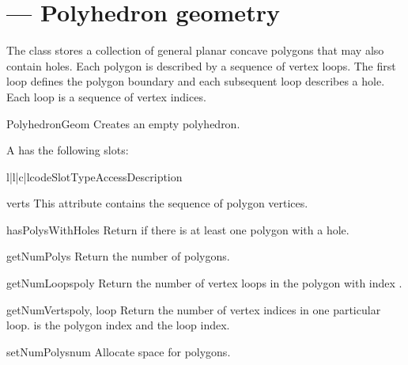 
\section{ ---
         Polyhedron geometry}

The  class stores a collection of general planar
concave polygons that may also contain holes. Each polygon is described
by a sequence of vertex loops. The first loop defines the polygon boundary
and each subsequent loop describes a hole. Each loop is a sequence of
vertex indices.

\begin{classdesc}{PolyhedronGeom}{}
Creates an empty polyhedron.
\end{classdesc}

A  has the following slots:

\begin{tableiv}{l|l|c|l}{code}{Slot}{Type}{Access}{Description}
\end{tableiv}

\begin{memberdesc}{verts}
This attribute contains the sequence of polygon vertices.
\end{memberdesc}

\begin{methoddesc}{hasPolysWithHoles}{}
Return  if there is at least one polygon with a hole.
\end{methoddesc}

\begin{methoddesc}{getNumPolys}{}
Return the number of polygons.
\end{methoddesc}

\begin{methoddesc}{getNumLoops}{poly}
Return the number of vertex loops in the polygon with index .
\end{methoddesc}

\begin{methoddesc}{getNumVerts}{poly, loop}
Return the number of vertex indices in one particular loop. 
is the polygon index and  the loop index.
\end{methoddesc}

\begin{methoddesc}{setNumPolys}{num}
Allocate space for  polygons.
\end{methoddesc}

